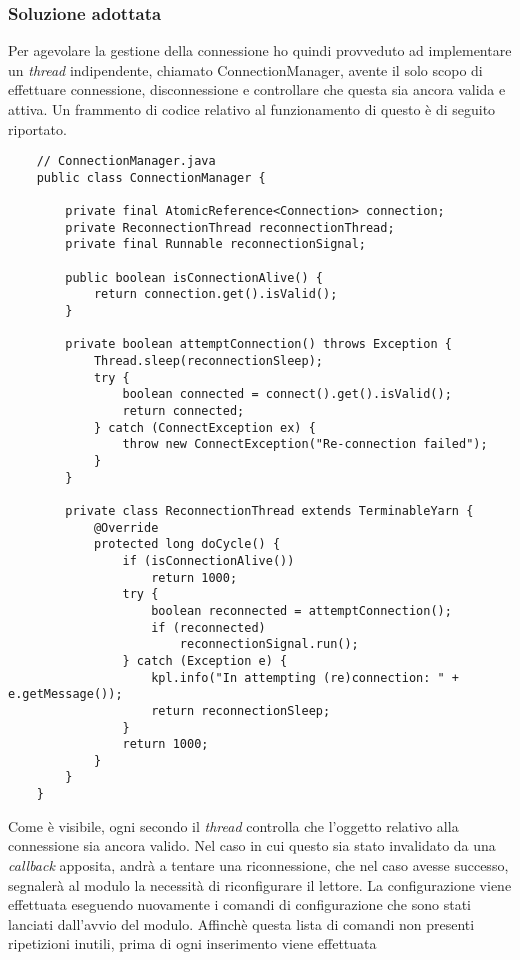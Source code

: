 \subsubsection*{Soluzione adottata}
Per agevolare la gestione della connessione ho quindi provveduto ad implementare un \emph{thread} indipendente,
chiamato ConnectionManager, avente il solo scopo di effettuare connessione, disconnessione e controllare che questa sia ancora valida e attiva.
Un frammento di codice relativo al funzionamento di questo è di seguito riportato. 
\begin{lstlisting}
    // ConnectionManager.java
    public class ConnectionManager {

        private final AtomicReference<Connection> connection;
        private ReconnectionThread reconnectionThread;
        private final Runnable reconnectionSignal;

        public boolean isConnectionAlive() {
		    return connection.get().isValid();
	    }

        private boolean attemptConnection() throws Exception {
		    Thread.sleep(reconnectionSleep);
		    try {
			    boolean connected = connect().get().isValid();
			    return connected;
		    } catch (ConnectException ex) {
			    throw new ConnectException("Re-connection failed");
		    }
	    }

        private class ReconnectionThread extends TerminableYarn {
            @Override
            protected long doCycle() {
                if (isConnectionAlive())
                    return 1000;
                try {
                    boolean reconnected = attemptConnection();
                    if (reconnected)
                        reconnectionSignal.run();
                } catch (Exception e) {
                    kpl.info("In attempting (re)connection: " + e.getMessage());
                    return reconnectionSleep;
                }
                return 1000;
            }
	    }
	}
\end{lstlisting}
Come è visibile, ogni secondo il \emph{thread} controlla che l'oggetto relativo alla connessione sia ancora valido.
Nel caso in cui questo sia stato invalidato da una \emph{callback} apposita, andrà a tentare una riconnessione, che
nel caso avesse successo, segnalerà al modulo la necessità di riconfigurare il lettore.
La configurazione viene effettuata eseguendo nuovamente i comandi di configurazione che sono stati lanciati dall'avvio
del modulo. Affinchè questa lista di comandi non presenti ripetizioni inutili, prima di ogni inserimento viene effettuata
